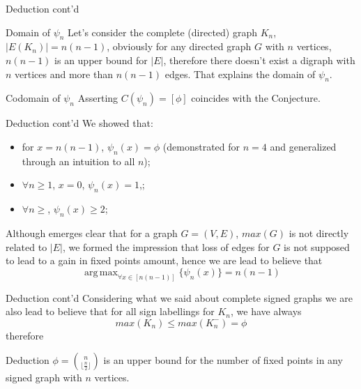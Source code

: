\documentclass{beamer}
\DeclareMathOperator*{\argmax}{arg\,max}
\newcommand{\floor}[1]{\lfloor #1 \rfloor}
\begin{document}
\begin{frame}{Deduction cont'd}
    \begin{block}{Domain of $\psi_n$}
        \justifying
        Let's consider the complete (directed) graph $K_n$, $|E(K_n)| = n(n-1)$, obviously for any directed graph $G$ with $n$ vertices, $n(n-1)$ is an upper bound for $|E|$, therefore there doesn't exist a digraph with $n$ vertices and more than $n(n-1)$ edges. That explains the domain of $\psi_n$.
    \end{block}
    
    \begin{block}{Codomain of $\psi_n$}
    \justifying
        Asserting $C(\psi_n) = [\phi]$ coincides with the Conjecture.
    \end{block}
\end{frame}

\begin{frame}{Deduction cont'd}
    \justifying
    We showed that:
    \begin{itemize}
        \justifying
        \item for $x=n(n-1)$, $\psi_n(x) = \phi$ (demonstrated for $n=4$ and generalized through an intuition to all $n$);
        \item $\forall n \geq 1$, $x=0$, $\psi_n(x) = 1$,;
        \item $\forall n \geq $, $\psi_n(x) \geq 2$; 
    \end{itemize}
    Although emerges clear that for a graph $G=(V,E)$, $max(G)$ is not directly related to $|E|$, we formed the impression that loss of edges for $G$ is not supposed to lead to a gain in fixed points amount, hence we are lead to believe that
    \[
    \argmax_{\forall x \in [n(n-1)]} \{ \psi_n(x) \} = n(n-1)
    \]
\end{frame}

\begin{frame}{Deduction cont'd}
    \justifying
    Considering what we said about complete signed graphs we are also lead to believe that for all sign labellings for $K_n$, we have always
    \[
        max(K_n) \leq max(K_n^-) = \phi
    \]
    therefore
    
    \begin{alertblock}{Deduction}
        \justifying
        $\phi = \binom{n}{\floor{\frac{n}{2}}}$ is an upper bound for the number of fixed points in any signed graph with $n$ vertices.
    \end{alertblock}
\end{frame}
\end{document}
